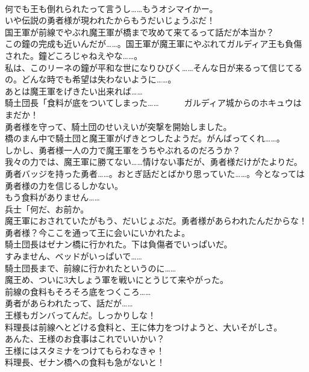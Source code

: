 \documentclass[8pt]{extreport}
\begin{document}
\begin{CJK}{UTF8}{min}
\\	何でも王も倒れられたって言うし……もうオシマイかー。	
\\	いや伝説の勇者様が現われたからもうだいじょうぶだ！	
\\	国王軍が前線でやぶれ魔王軍が橋まで攻めて来てるって話だが本当か？	
\\	この鐘の完成も近いんだが……。国王軍が魔王軍にやぶれてガルディア王も負傷された。鐘どころじゃねえやな……。	
\\	私は、このリーネの鐘が平和な世になりひびく……そんな日が来るって信じてるの。どんな時でも希望は失わないように……。	
\\	あとは魔王軍をげきたい出来れば……	
\\	騎土団長「食料が底をついてしまった……　　　ガルディア城からのホキュウはまだか！	
\\	勇者様を守って、騎土団のせいえいが突撃を開始しました。	
\\	橋のまん中で騎土団と魔王軍がげきとつしたようだ。がんばってくれ……。	
\\	しかし、勇者様一人の力で魔王軍をうちやぶれるのだろうか？	
\\	我々の力では、魔王軍に勝てない……情けない事だが、勇者様だけがたよりだ。	
\\	勇者バッジを持った勇者……。おとぎ話だとばかり思っていた……。今となっては勇者様の力を信じるしかない。	
\\	もう食料がありません……	
\\	兵士「何だ、お前か。	
\\	魔王軍におされていたがもう、だいじょぶだ。勇者様があらわれたんだからな！	
\\	勇者様？今ここを通って王に会いにいかれたよ。	
\\	騎土団長はゼナン橋に行かれた。下は負傷者でいっぱいだ。	
\\	すみません、ベッドがいっぱいで……	
\\	騎土団長まで、前線に行かれたというのに……	
\\	魔王め、ついに3大しょう軍を戦いにとうじて来やがった。	
\\	前線の食料もそろそろ底をつくころ……	
\\	勇者があらわれたって、話だが……	
\\	王様もガンバってんだ。しっかりしな！	
\\	料理長は前線へとどける食料と、王に体力をつけようと、大いそがしさ。	
\\	あんた、王様のお食事はこれでいいかい？	
\\	王様にはスタミナをつけてもらわなきゃ！	
\\	料理長、ゼナン橋への食料も急がないと！	

\end{CJK}
\end{document}
